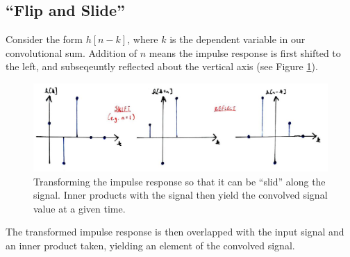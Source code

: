 \subsection{``Flip and Slide''}
%
Consider the form $h[n-k]$, where $k$ is the dependent variable in our convolutional
sum. Addition of $n$ means the impulse response is first shifted to the left, and
subseqeuntly reflected about the vertical axis (see Figure
\ref{fig::lecture_3_flip_and_slide}).
%
\begin{figure}[!htb]
  \includegraphics[width=\textwidth]{images/lecture_3_flip_and_slide.JPG}
  \caption{
    Transforming the impulse response so that it can be ``slid'' along the
    signal. Inner products with the signal then yield the convolved signal
    value at a given time.
  }
  \label{fig::lecture_3_flip_and_slide}
\end{figure}
%
The transformed impulse response is then overlapped with the input
signal and an inner product taken, yielding an element of the convolved
signal.

